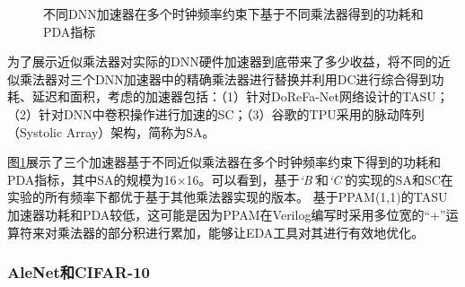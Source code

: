\begin{figure}[!ht]
{\begin{minipage}[t]{0.33\linewidth}
      \end{minipage}
      \hspace{-4.3mm}
    }%
    \centering
    \caption{不同DNN加速器在多个时钟频率约束下基于不同乘法器得到的功耗和PDA指标}
    \label{AC:AM:Adapt:Fig:Accs}
\end{figure}

为了展示近似乘法器对实际的DNN硬件加速器到底带来了多少收益，将不同的近似乘法器对三个DNN加速器中的精确乘法器进行替换并利用DC进行综合得到功耗、延迟和面积，考虑的加速器包括：（1）针对DoReFa-Net网络\cite{DNN:DoReFa-Net}设计的TASU\cite{Accelerator:JiaoLi}；（2）针对DNN中卷积操作进行加速的SC\cite{Accelerator:SC}；（3）谷歌的TPU采用的脉动阵列（Systolic Array）架构\cite{Accelerator:TPU}，简称为SA。

图\ref{AC:AM:Adapt:Fig:Accs}展示了三个加速器基于不同近似乘法器在多个时钟频率约束下得到的功耗和PDA指标，其中SA的规模为16$\times$16。可以看到，基于\emph{`B'}和\emph{`C'}的实现的SA和SC在实验的所有频率下都优于基于其他乘法器实现的版本。
基于PPAM(1,1)的TASU加速器功耗和PDA较低，这可能是因为PPAM在Verilog编写时采用多位宽的“+”运算符来对乘法器的部分积进行累加，能够让EDA工具对其进行有效地优化。

\subsubsection{AleNet和CIFAR-10}

